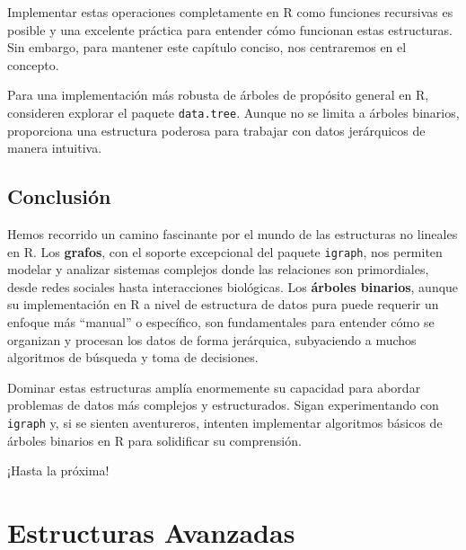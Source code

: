 \documentclass[
  spanish,
  letterpaper,
  DIV=11,
  numbers=noendperiod]{scrreprt}
\begin{document}
Implementar estas operaciones completamente en R como funciones
recursivas es posible y una excelente práctica para entender cómo
funcionan estas estructuras. Sin embargo, para mantener este capítulo
conciso, nos centraremos en el concepto.

\begin{tcolorbox}[enhanced jigsaw, arc=.35mm, bottomrule=.15mm, bottomtitle=1mm, breakable, colback=white, colbacktitle=quarto-callout-tip-color!10!white, colframe=quarto-callout-tip-color-frame, coltitle=black, left=2mm, leftrule=.75mm, opacityback=0, opacitybacktitle=0.6, rightrule=.15mm, title=\textcolor{quarto-callout-tip-color}{\faLightbulb}\hspace{0.5em}{Tip}, titlerule=0mm, toprule=.15mm, toptitle=1mm]

Para una implementación más robusta de árboles de propósito general en
R, consideren explorar el paquete \texttt{data.tree}. Aunque no se
limita a árboles binarios, proporciona una estructura poderosa para
trabajar con datos jerárquicos de manera intuitiva.

\end{tcolorbox}

\section{Conclusión}\label{conclusiuxf3n-3}

Hemos recorrido un camino fascinante por el mundo de las estructuras no
lineales en R. Los \textbf{grafos}, con el soporte excepcional del
paquete \texttt{igraph}, nos permiten modelar y analizar sistemas
complejos donde las relaciones son primordiales, desde redes sociales
hasta interacciones biológicas. Los \textbf{árboles binarios}, aunque su
implementación en R a nivel de estructura de datos pura puede requerir
un enfoque más ``manual'' o específico, son fundamentales para entender
cómo se organizan y procesan los datos de forma jerárquica, subyaciendo
a muchos algoritmos de búsqueda y toma de decisiones.

Dominar estas estructuras amplía enormemente su capacidad para abordar
problemas de datos más complejos y estructurados. Sigan experimentando
con \texttt{igraph} y, si se sienten aventureros, intenten implementar
algoritmos básicos de árboles binarios en R para solidificar su
comprensión.

¡Hasta la próxima!


\chapter{Estructuras Avanzadas}\label{estructuras-avanzadas}
\end{document}
